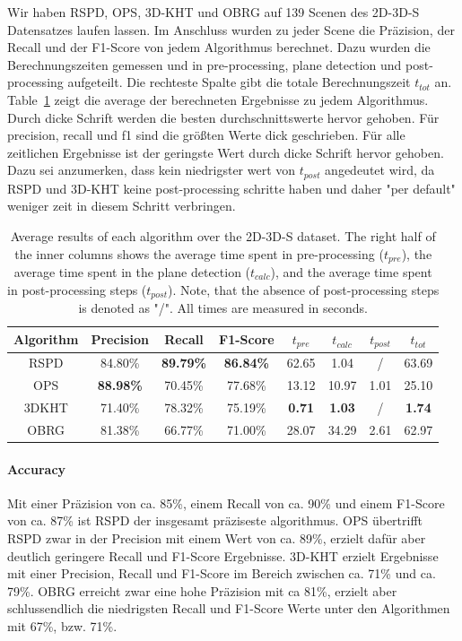 \documentclass[main.tex]{subfiles}
\begin{document}
Wir haben RSPD, OPS, 3D-KHT und OBRG auf 139 Scenen des 2D-3D-S Datensatzes laufen lassen. Im Anschluss wurden zu jeder Scene die Präzision,
der Recall und der F1-Score von jedem Algorithmus berechnet. Dazu wurden die Berechnungszeiten gemessen und in pre-processing, plane detection und
post-processing aufgeteilt. Die rechteste Spalte gibt die totale Berechnungszeit $t_{tot}$ an. Table~\ref{tab:res-3d2ds-total} zeigt die average der berechneten Ergebnisse zu jedem Algorithmus. Durch dicke Schrift
werden die besten durchschnittswerte hervor gehoben. Für precision, recall und f1 sind die größten Werte dick geschrieben. Für alle zeitlichen
Ergebnisse ist der geringste Wert durch dicke Schrift hervor gehoben. Dazu sei anzumerken, dass kein niedrigster wert von $t_{post}$ angedeutet 
wird, da RSPD und 3D-KHT keine post-processing schritte haben und daher "per default" weniger zeit in diesem Schritt verbringen.

\begin{table}[H]
    \centering
    \begin{tabular}{c|cccccc|c}
        Algorithm & Precision        & Recall           & F1-Score         & $t_{pre}$     & $t_{calc}$    & $t_{post}$ & $t_{tot}$     \\ \hline
        RSPD      & 84.80\%          & \textbf{89.79\%} & \textbf{86.84\%} & 62.65         & 1.04          & /          & 63.69         \\
        OPS       & \textbf{88.98\%} & 70.45\%          & 77.68\%          & 13.12         & 10.97         & 1.01       & 25.10         \\
        3DKHT     & 71.40\%          & 78.32\%          & 75.19\%          & \textbf{0.71} & \textbf{1.03} & /          & \textbf{1.74} \\
        OBRG      & 81.38\%          & 66.77\%          & 71.00\%          & 28.07         & 34.29         & 2.61       & 62.97
    \end{tabular}
    \caption[Overall 2D-3D-S Results]{Average results of each algorithm over the 2D-3D-S dataset. The right half of the inner columns shows the average time spent in
        pre-processing ($t_{pre}$), the average time spent in the plane detection ($t_{calc}$), and the average time spent in post-processing steps ($t_{post}$).
        Note, that the absence of post-processing steps is denoted as "/". All times are measured in seconds.}
    \label{tab:res-3d2ds-total}
\end{table}

\paragraph{Accuracy}
Mit einer Präzision von ca. 85\%, einem Recall von ca. 90\% und einem F1-Score von ca. 87\% ist RSPD der insgesamt präziseste algorithmus.
OPS übertrifft RSPD zwar in der Precision mit einem Wert von ca. 89\%, erzielt dafür aber deutlich geringere Recall und F1-Score Ergebnisse.
3D-KHT erzielt Ergebnisse mit einer Precision, Recall und F1-Score im Bereich zwischen ca. 71\% und ca. 79\%.
OBRG erreicht zwar eine hohe Präzision mit ca 81\%, erzielt aber schlussendlich die niedrigsten Recall und F1-Score Werte unter den Algorithmen mit
67\%, bzw. 71\%.
\end{document}

